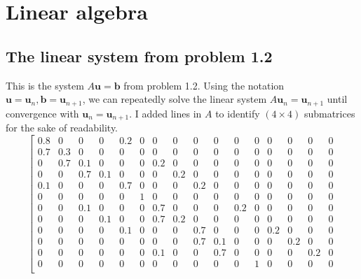 \documentclass[letterpaper, 10pt]{article}
\begin{document}
\section{Linear algebra}
\subsection{The linear system from problem 1.2}
\label{ssec:matrix}
This is the system $A\mathbf{u} = \mathbf{b}$ from problem 1.2. Using the notation $\mathbf{u} = \mathbf{u}_n, \mathbf{b} = \mathbf{u}_{n+1}$, we can repeatedly solve the linear system $A \mathbf{u}_n = \mathbf{u}_{n+1}$ until convergence with $\mathbf{u}_n = \mathbf{u}_{n+1}$. I added lines in $A$ to identify $(4 \times 4)$ submatrices for the sake of readability. 
\[
\left[
\begin{array}{cccc|cccc|cccc|cccc}
0.8 & 0    & 0   & 0   & 0.2 & 0   & 0   & 0   & 0   & 0   & 0   & 0   & 0   & 0   & 0   & 0   \\ %
0.7 & 0.3  & 0   & 0   & 0   & 0   & 0   & 0   & 0   & 0   & 0   & 0   & 0   & 0   & 0   & 0   \\ %
0   & 0.7  & 0.1 & 0   & 0   & 0   & 0.2 & 0   & 0   & 0   & 0   & 0   & 0   & 0   & 0   & 0   \\ %
0   & 0    & 0.7 & 0.1 & 0   & 0   & 0   & 0.2 & 0   & 0   & 0   & 0   & 0   & 0   & 0   & 0   \\ %
\hline
0.1 & 0    & 0   & 0   & 0.7 & 0   & 0   & 0   & 0.2 & 0   & 0   & 0   & 0   & 0   & 0   & 0   \\ %
0   & 0    & 0   & 0   & 0   & 1   & 0   & 0   & 0   & 0   & 0   & 0   & 0   & 0   & 0   & 0   \\ %
0   & 0    & 0.1 & 0   & 0   & 0   & 0.7 & 0   & 0   & 0   & 0.2 & 0   & 0   & 0   & 0   & 0   \\ %
0   & 0    & 0   & 0.1 & 0   & 0   & 0.7 & 0.2 & 0   & 0   & 0   & 0   & 0   & 0   & 0   & 0   \\ %
\hline
0   & 0    & 0   & 0   & 0.1 & 0   & 0   & 0   & 0.7 & 0   & 0   & 0   & 0.2 & 0   & 0   & 0   \\ %
0   & 0    & 0   & 0   & 0   & 0   & 0   & 0   & 0.7 & 0.1 & 0   & 0   & 0   & 0.2 & 0   & 0   \\ %
0   & 0    & 0   & 0   & 0   & 0   & 0.1 & 0   & 0   & 0.7 & 0   & 0   & 0   & 0   & 0.2 & 0   \\ %
0   & 0    & 0   & 0   & 0   & 0   & 0   & 0   & 0   & 0   & 0   & 1   & 0   & 0   & 0   & 0   \\ %

\end{array}\]
\end{document}
